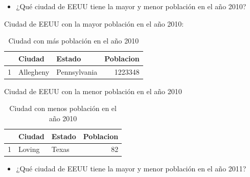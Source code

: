 \documentclass[conference]{IEEEtran}\usepackage[]{graphicx}\usepackage[]{color}
\begin{document}
\begin{itemize}
\item ¿Qué ciudad de EEUU tiene la mayor y menor población en el año 2010?
\end{itemize}


Ciudad de EEUU con la mayor población en el año 2010:
\begin{table}[ht]
\centering
\begin{tabular}{rllr}
  \hline
 & Ciudad & Estado & Poblacion \\ 
  \hline
1 & Allegheny & Pennsylvania & 1223348 \\ 
   \hline
\end{tabular}
\caption{Ciudad con más población en el año 2010} 
\end{table}

\vspace{-6mm}
Ciudad de EEUU con la menor población en el año 2010

\begin{table}[ht]
\centering
\begin{tabular}{rllr}
  \hline
 & Ciudad & Estado & Poblacion \\ 
  \hline
1 & Loving & Texas &  82 \\ 
   \hline
\end{tabular}
\caption{Ciudad con menos población en el año 2010} 
\end{table}


\begin{itemize}
\item ¿Qué ciudad de EEUU tiene la mayor y menor población en el año 2011?
\end{itemize}


\end{document}
